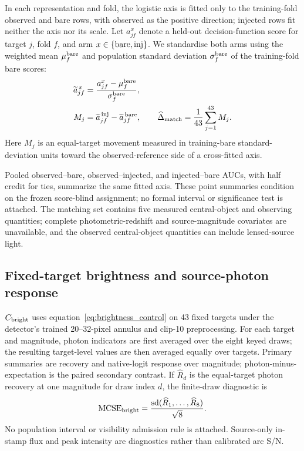 In each representation and fold, the logistic axis is fitted only to the
training-fold observed and bare rows, with observed as the positive direction;
injected rows fit neither the axis nor its scale. Let \(a_{jf}^{x}\) denote a
held-out decision-function score for target \(j\), fold \(f\), and arm
\(x\in\{{\rm bare},{\rm inj}\}\). We standardise both arms using the weighted
mean \(\mu_f^{\rm bare}\) and population standard deviation
\(\sigma_f^{\rm bare}\) of the training-fold bare scores:
\begin{equation}
\begin{aligned}
\widetilde a_{jf}^{\,x}
&=\frac{a_{jf}^{x}-\mu_f^{\rm bare}}{\sigma_f^{\rm bare}},\\
M_j&=\widetilde a_{jf}^{\,{\rm inj}}-\widetilde a_{jf}^{\,{\rm bare}},
\qquad
\widehat\Delta_{\rm match}=\frac{1}{43}\sum_{j=1}^{43}M_j .
\end{aligned}
\label{eq:gmatch_movement}
\end{equation}
Here \(M_j\) is an equal-target movement measured in training-bare
standard-deviation units toward the observed-reference side of a cross-fitted
axis.

Pooled observed--bare, observed--injected, and injected--bare AUCs, with half
credit for ties, summarize the same fitted axis. These point summaries
condition on the frozen score-blind assignment; no formal interval or
significance test is attached. The matching set contains five measured
central-object and observing quantities; complete photometric-redshift and
source-magnitude covariates are unavailable, and the observed central-object
quantities can include lensed-source light.

\subsection{Fixed-target brightness and source-photon response}
\label{sec:bounded_control_methods}

\(C_{\rm bright}\) uses equation~\eqref{eq:brightness_control} on 43 fixed
targets under the detector's trained 20--32-pixel annulus and clip-10
preprocessing. For each target and magnitude, photon indicators are first
averaged over the eight keyed draws; the resulting target-level values are
then averaged equally over targets. Primary summaries are recovery and
native-logit response over magnitude; photon-minus-expectation is the paired
secondary contrast. If \(\widehat R_d\) is the equal-target photon recovery at
one magnitude for draw index \(d\), the finite-draw diagnostic is
\begin{equation}
 {\rm MCSE}_{\rm bright}
 =\frac{{\rm sd}(\widehat R_1,\ldots,\widehat R_8)}{\sqrt{8}} .
\label{eq:brightness_mcse}
\end{equation}
No population interval or visibility admission rule is attached. Source-only
in-stamp flux and peak intensity are diagnostics rather than calibrated arc
S/N.

